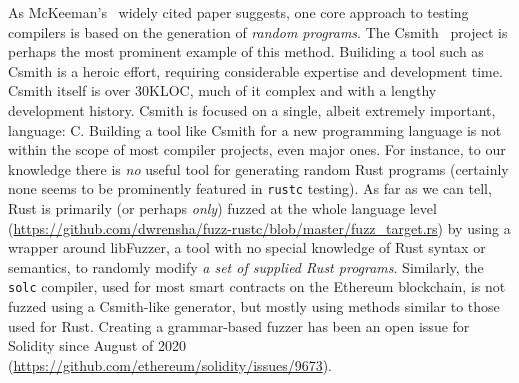 As McKeeman's~\cite{Differential} widely cited paper suggests, one core approach to testing compilers is
based on
the generation of \emph{random programs}.  The Csmith~\cite{csmith} project is perhaps the most prominent
example of this method.  Builiding a tool such as Csmith
is a heroic effort, requiring considerable expertise and
development time.  Csmith itself is over 30KLOC, much of it complex
and with a lengthy development history.  Csmith is focused on a
single, albeit extremely important, language: C.  Building a tool like
Csmith for a new programming language is not within the scope of most
compiler projects, even major ones.  For instance, to our knowledge
there is \emph{no} useful tool for generating random Rust programs
(certainly none seems to be
prominently featured in {\tt rustc} testing).  As far as we can tell, Rust
is primarily (or perhaps \emph{only}) fuzzed at the whole language
level
(\url{https://github.com/dwrensha/fuzz-rustc/blob/master/fuzz_target.rs}) by
using a wrapper around libFuzzer, a tool with no special knowledge of Rust
syntax or semantics, to randomly modify \emph{a set of supplied Rust
programs}.  Similarly, the {\tt solc} compiler, used for most smart contracts on
the Ethereum blockchain, is not fuzzed using a Csmith-like
generator, but mostly using methods similar to those used for
Rust.  Creating a
grammar-based fuzzer has been an open issue for Solidity since August
of 2020 (\url{https://github.com/ethereum/solidity/issues/9673}).

